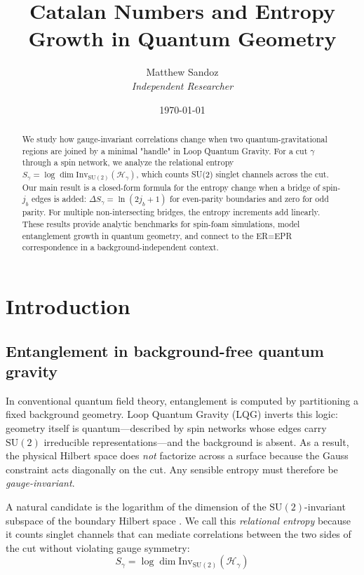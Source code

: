 \documentclass[11pt, a4paper]{article}
\title{Catalan Numbers and Entropy Growth in Quantum Geometry}
\author{Matthew Sandoz\\ \textit{Independent Researcher}}
\date{\today}
\theoremstyle{plain}
\theoremstyle{definition}
\theoremstyle{remark}
\newcommand{\Hil}{\mathcal{H}}
\newcommand{\Inv}{\mathrm{Inv}}
\newcommand{\SU}{\mathrm{SU}}
\begin{document}
\begin{abstract}
We study how gauge-invariant correlations change when two quantum-gravitational regions are joined by a minimal "handle" in Loop Quantum Gravity. For a cut $\gamma$ through a spin network, we analyze the relational entropy $S_{\gamma} = \log\dim\Inv_{\SU(2)}(\Hil_{\gamma})$, which counts SU(2) singlet channels across the cut. Our main result is a closed-form formula for the entropy change when a bridge of spin-$j_b$ edges is added: $\Delta S_{\gamma} = \ln(2j_b+1)$ for even-parity boundaries and zero for odd parity. For multiple non-intersecting bridges, the entropy increments add linearly. These results provide analytic benchmarks for spin-foam simulations, model entanglement growth in quantum geometry, and connect to the ER=EPR correspondence in a background-independent context.
\end{abstract}

\maketitle

\section{Introduction}
\label{sec:intro}

\subsection{Entanglement in background-free quantum gravity}

In conventional quantum field theory, entanglement is computed by partitioning a fixed background geometry. Loop Quantum Gravity (LQG) inverts this logic: geometry itself is quantum—described by spin networks whose edges carry $\SU(2)$ irreducible representations—and the background is absent. As a result, the physical Hilbert space does \emph{not} factorize across a surface because the Gauss constraint acts diagonally on the cut. Any sensible entropy must therefore be \emph{gauge-invariant}.

A natural candidate is the logarithm of the dimension of the $\SU(2)$-invariant subspace of the boundary Hilbert space \cite{DonnellyFreidel2016,DonnellyWall2016}. We call this \emph{relational entropy} because it counts singlet channels that can mediate correlations between the two sides of the cut without violating gauge symmetry:
\begin{equation}
S_{\gamma} = \log\dim\Inv_{\SU(2)}(\Hil_{\gamma})
\end{equation}
\end{document}
